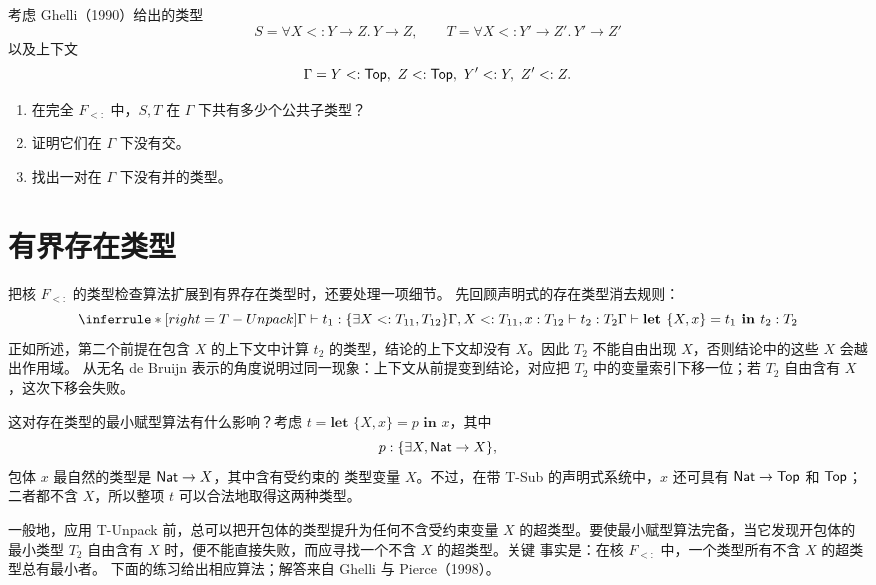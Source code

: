 \begin{exercise}
\label{ex:28.6.3}
考虑 Ghelli（1990）给出的类型
\[
S=\forall X<:Y\to Z.\,Y\to Z,
\qquad
T=\forall X<:Y'\to Z'.\,Y'\to Z'
\]
以及上下文
\[
\Gamma=Y<:\tapltype{Top},\ Z<:\tapltype{Top},\
Y'<:Y,\ Z'<:Z.
\]
\begin{enumerate}
  \item 在完全 \(F_{<:}\) 中，\(S,T\) 在 \(\Gamma\) 下共有多少个公共子类型？
  \item 证明它们在 \(\Gamma\) 下没有交。
  \item 找出一对在 \(\Gamma\) 下没有并的类型。
\end{enumerate}
\end{exercise}

\section{有界存在类型}
\label{sec:28.7}

把核 \(F_{<:}\) 的类型检查算法扩展到有界存在类型时，还要处理一项细节。
先回顾声明式的存在类型消去规则：
\[
\inferrule*[right=T-Unpack]
 {\Gamma\vdash t_1:\{\exists X<:T_{11},T_{12}\}\\
  \Gamma,X<:T_{11},x:T_{12}\vdash t_2:T_2}
 {\Gamma\vdash
  \textbf{let }\{X,x\}=t_1\textbf{ in }t_2:T_2}
\]
正如所述，第二个前提在包含 \(X\) 的上下文中计算
\(t_2\) 的类型，结论的上下文却没有 \(X\)。因此 \(T_2\) 不能自由出现
\(X\)，否则结论中的这些 \(X\) 会越出作用域。
从无名 de Bruijn 表示的角度说明过同一现象：上下文从前提变到结论，对应把
\(T_2\) 中的变量索引下移一位；若 \(T_2\) 自由含有 \(X\)，这次下移会失败。

这对存在类型的最小赋型算法有什么影响？考虑
\(t=\textbf{let }\{X,x\}=p\textbf{ in }x\)，其中
\[
p:\{\exists X,\mathsf{Nat}\to X\},
\]
包体 \(x\) 最自然的类型是 \(\mathsf{Nat}\to X\)，其中含有受约束的
类型变量 \(X\)。不过，在带 T-Sub 的声明式系统中，\(x\) 还可具有
\(\mathsf{Nat}\to\mathsf{Top}\) 和 \(\mathsf{Top}\)；二者都不含
\(X\)，所以整项 \(t\) 可以合法地取得这两种类型。

一般地，应用 T-Unpack 前，总可以把开包体的类型提升为任何不含受约束变量
\(X\) 的超类型。要使最小赋型算法完备，当它发现开包体的最小类型 \(T_2\)
自由含有 \(X\) 时，便不能直接失败，而应寻找一个不含 \(X\) 的超类型。关键
事实是：在核 \(F_{<:}\) 中，一个类型所有不含 \(X\) 的超类型总有最小者。
下面的练习给出相应算法；解答来自 Ghelli 与 Pierce（1998）。

